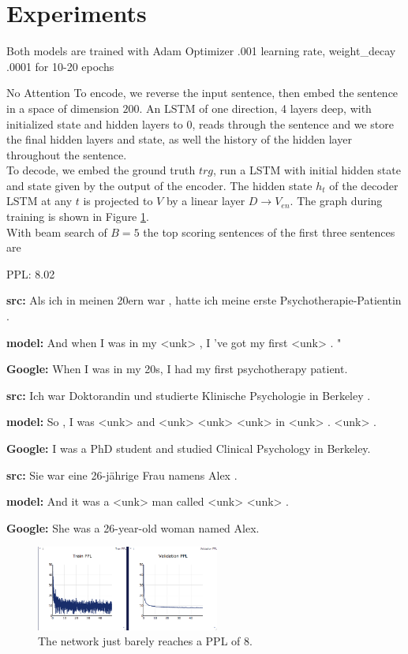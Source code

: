 \documentclass[11pt]{article}
\begin{document}
\section{Experiments}
Both models are trained with Adam Optimizer .001 learning rate, weight\_decay .0001 for 10-20 epochs 
\begin{subsection}{No Attention}
To encode, we reverse the input sentence, then embed the sentence in a space of dimension $200$. An LSTM of one direction, 4 layers deep, with initialized state and hidden layers to 0, reads through the sentence and we store the final hidden layers and state, as well the history of the hidden layer throughout the sentence.\\
To decode, we embed the ground truth $trg$, run a LSTM with initial hidden state and state given by the output of the encoder. The hidden state $h_t$ of the decoder LSTM at any $t$ is projected to $V$ by a linear layer $D \rightarrow V_{en}$. The graph during training is shown in Figure \ref{fig:noatt}.\\
With beam search of $B=5$ the top scoring sentences of the first three sentences are
\centerline{PPL: 8.02}
\centerline{{\bf src:} Als ich in meinen 20ern war , hatte ich meine erste Psychotherapie-Patientin .}
\centerline{{\bf model:} And when I was in my <unk> , I 've got my first <unk> . "}
\centerline{{\bf Google:} When I was in my 20s, I had my first psychotherapy patient.}
\centerline{}
\centerline{{\bf src:} Ich war Doktorandin und studierte Klinische Psychologie in Berkeley .}
\centerline{{\bf model:} So , I was <unk> and <unk> <unk> <unk> in <unk> . <unk> .}
\centerline{{\bf Google:} I was a PhD student and studied Clinical Psychology in Berkeley.}
\centerline{}
\centerline{{\bf src:} Sie war eine 26-jährige Frau namens Alex .}
\centerline{{\bf model:} And it was a <unk> man called <unk> <unk> .}
\centerline{{\bf Google:} She was a 26-year-old woman named Alex.}

 \begin{figure}
  \centering
  \includegraphics[width=6cm]{imgs/noatt}
  \caption{\label{fig:noatt} The network just barely reaches a PPL of 8.}
\end{figure}


\end{subsection}
\end{document}
